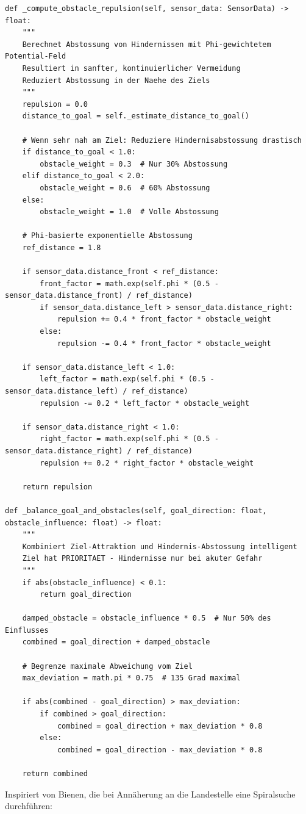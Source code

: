 ﻿\documentclass[a4paper,12pt]{article}
\theoremstyle{definition}
\begin{document}
\begin{lstlisting}[style=pythonstyle, caption={Hindernis-Behandlung mit Phi-Gewichtung}]
def _compute_obstacle_repulsion(self, sensor_data: SensorData) -> float:
    """
    Berechnet Abstossung von Hindernissen mit Phi-gewichtetem Potential-Feld
    Resultiert in sanfter, kontinuierlicher Vermeidung
    Reduziert Abstossung in der Naehe des Ziels
    """
    repulsion = 0.0
    distance_to_goal = self._estimate_distance_to_goal()
    
    # Wenn sehr nah am Ziel: Reduziere Hindernisabstossung drastisch
    if distance_to_goal < 1.0:
        obstacle_weight = 0.3  # Nur 30% Abstossung
    elif distance_to_goal < 2.0:
        obstacle_weight = 0.6  # 60% Abstossung
    else:
        obstacle_weight = 1.0  # Volle Abstossung
    
    # Phi-basierte exponentielle Abstossung
    ref_distance = 1.8
    
    if sensor_data.distance_front < ref_distance:
        front_factor = math.exp(self.phi * (0.5 - sensor_data.distance_front) / ref_distance)
        if sensor_data.distance_left > sensor_data.distance_right:
            repulsion += 0.4 * front_factor * obstacle_weight
        else:
            repulsion -= 0.4 * front_factor * obstacle_weight
    
    if sensor_data.distance_left < 1.0:
        left_factor = math.exp(self.phi * (0.5 - sensor_data.distance_left) / ref_distance)
        repulsion -= 0.2 * left_factor * obstacle_weight
    
    if sensor_data.distance_right < 1.0:
        right_factor = math.exp(self.phi * (0.5 - sensor_data.distance_right) / ref_distance)
        repulsion += 0.2 * right_factor * obstacle_weight
    
    return repulsion

def _balance_goal_and_obstacles(self, goal_direction: float, obstacle_influence: float) -> float:
    """
    Kombiniert Ziel-Attraktion und Hindernis-Abstossung intelligent
    Ziel hat PRIORITAET - Hindernisse nur bei akuter Gefahr
    """
    if abs(obstacle_influence) < 0.1:
        return goal_direction
    
    damped_obstacle = obstacle_influence * 0.5  # Nur 50% des Einflusses
    combined = goal_direction + damped_obstacle
    
    # Begrenze maximale Abweichung vom Ziel
    max_deviation = math.pi * 0.75  # 135 Grad maximal
    
    if abs(combined - goal_direction) > max_deviation:
        if combined > goal_direction:
            combined = goal_direction + max_deviation * 0.8
        else:
            combined = goal_direction - max_deviation * 0.8
    
    return combined
\end{lstlisting}
Inspiriert von Bienen, die bei Annäherung an die Landestelle eine Spiralsuche durchführen:
\end{document}
